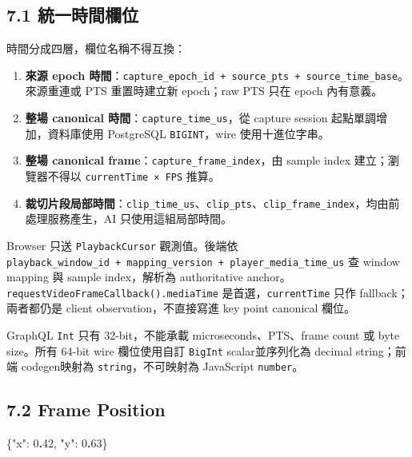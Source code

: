 \documentclass[
  9pt,
  a4paper,
]{article}
\newenvironment{Shaded}{}{}
\newcommand{\DataTypeTok}[1]{\textcolor[rgb]{0.56,0.13,0.00}{#1}}
\newcommand{\DecValTok}[1]{\textcolor[rgb]{0.25,0.63,0.44}{#1}}
\newcommand{\ErrorTok}[1]{\textcolor[rgb]{1.00,0.00,0.00}{\textbf{#1}}}
\newcommand{\FunctionTok}[1]{\textcolor[rgb]{0.02,0.16,0.49}{#1}}
\providecommand{\tightlist}{%
  \setlength{\itemsep}{0pt}\setlength{\parskip}{0pt}}
\begin{document}
\subsection{7.1
統一時間欄位}\label{71-ux7d71ux4e00ux6642ux9593ux6b04ux4f4d}

時間分成四層，欄位名稱不得互換：

\begin{enumerate}
\def\labelenumi{\arabic{enumi}.}
\tightlist
\item
  \textbf{來源 epoch
  時間}：\texttt{capture\_\allowbreak{}epoch\_\allowbreak{}id\ +\ source\_\allowbreak{}pts\ +\ source\_\allowbreak{}time\_\allowbreak{}base}。來源重連或
  PTS 重置時建立新 epoch；raw PTS 只在 epoch 內有意義。
\item
  \textbf{整場 canonical 時間}：\texttt{capture\_\allowbreak{}time\_\allowbreak{}us}，從 capture
  session 起點單調增加，資料庫使用 PostgreSQL \texttt{BIGINT}，wire
  使用十進位字串。
\item
  \textbf{整場 canonical frame}：\texttt{capture\_\allowbreak{}frame\_\allowbreak{}index}，由
  sample index 建立；瀏覽器不得以 \texttt{currentTime\ ×\ FPS} 推算。
\item
  \textbf{裁切片段局部時間}：\texttt{clip\_\allowbreak{}time\_\allowbreak{}us}、\texttt{clip\_\allowbreak{}pts}、\texttt{clip\_\allowbreak{}frame\_\allowbreak{}index}，均由前處理服務產生，AI
  只使用這組局部時間。
\end{enumerate}

Browser 只送 \texttt{PlaybackCursor} 觀測值。後端依
\texttt{playback\_\allowbreak{}window\_\allowbreak{}id\ +\ mapping\_\allowbreak{}version\ +\ player\_\allowbreak{}media\_\allowbreak{}time\_\allowbreak{}us}
查 window mapping 與 sample index，解析為 authoritative
anchor。\texttt{requestVideoFrameCallback().mediaTime}
是首選，\texttt{currentTime} 只作 fallback；兩者都仍是 client
observation，不直接寫進 key point canonical 欄位。

GraphQL \texttt{Int} 只有 32-bit，不能承載 microseconds、PTS、frame
count 或 byte size。所有 64-bit wire 欄位使用自訂 \texttt{BigInt}
scalar並序列化為 decimal string；前端 codegen映射為
\texttt{string}，不可映射為 JavaScript \texttt{number}。

\subsection{7.2 Frame Position}\label{72-frame-position}

\begin{Shaded}
\begin{Highlighting}[]
\FunctionTok{\{}\DataTypeTok{"x"}\FunctionTok{:} \DecValTok{0}\ErrorTok{.}\DecValTok{42}\FunctionTok{,} \DataTypeTok{"y"}\FunctionTok{:} \DecValTok{0}\ErrorTok{.}\DecValTok{63}\FunctionTok{\}}
\end{Highlighting}
\end{Shaded}
\end{document}
